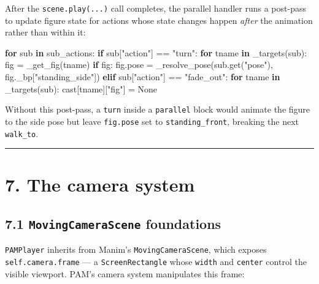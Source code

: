 \documentclass[
  11pt,
]{book}
\newenvironment{Shaded}{}{}
\newcommand{\ControlFlowTok}[1]{\textcolor[rgb]{0.00,0.44,0.13}{\textbf{#1}}}
\newcommand{\KeywordTok}[1]{\textcolor[rgb]{0.00,0.44,0.13}{\textbf{#1}}}
\newcommand{\NormalTok}[1]{#1}
\newcommand{\OperatorTok}[1]{\textcolor[rgb]{0.40,0.40,0.40}{#1}}
\newcommand{\StringTok}[1]{\textcolor[rgb]{0.25,0.44,0.63}{#1}}
\newcommand{\VariableTok}[1]{\textcolor[rgb]{0.10,0.09,0.49}{#1}}
\begin{document}
After the \texttt{scene.play(...)} call completes, the parallel handler
runs a post-pass to update figure state for actions whose state changes
happen \emph{after} the animation rather than within it:

\begin{Shaded}
\begin{Highlighting}[]
\ControlFlowTok{for}\NormalTok{ sub }\KeywordTok{in}\NormalTok{ sub\_actions:}
    \ControlFlowTok{if}\NormalTok{ sub[}\StringTok{"action"}\NormalTok{] }\OperatorTok{==} \StringTok{"turn"}\NormalTok{:}
        \ControlFlowTok{for}\NormalTok{ tname }\KeywordTok{in}\NormalTok{ \_targets(sub):}
\NormalTok{            fig }\OperatorTok{=}\NormalTok{ \_get\_fig(tname)}
            \ControlFlowTok{if}\NormalTok{ fig:}
\NormalTok{                fig.pose }\OperatorTok{=}\NormalTok{ \_resolve\_pose(sub.get(}\StringTok{"pose"}\NormalTok{),}
\NormalTok{                                         fig.\_bp[}\StringTok{"standing\_side"}\NormalTok{])}
    \ControlFlowTok{elif}\NormalTok{ sub[}\StringTok{"action"}\NormalTok{] }\OperatorTok{==} \StringTok{"fade\_out"}\NormalTok{:}
        \ControlFlowTok{for}\NormalTok{ tname }\KeywordTok{in}\NormalTok{ \_targets(sub):}
\NormalTok{            cast[tname][}\StringTok{"fig"}\NormalTok{] }\OperatorTok{=} \VariableTok{None}
\end{Highlighting}
\end{Shaded}

Without this post-pass, a \texttt{turn} inside a \texttt{parallel} block
would animate the figure to the side pose but leave \texttt{fig.pose}
set to \texttt{standing\_front}, breaking the next \texttt{walk\_to}.

\begin{center}\rule{0.5\linewidth}{0.5pt}\end{center}

\section{7. The camera system}\label{the-camera-system}

\subsection{\texorpdfstring{7.1 \texttt{MovingCameraScene}
foundations}{7.1 MovingCameraScene foundations}}\label{movingcamerascene-foundations}

\texttt{PAMPlayer} inherits from Manim's \texttt{MovingCameraScene},
which exposes \texttt{self.camera.frame} --- a \texttt{ScreenRectangle}
whose \texttt{width} and \texttt{center} control the visible viewport.
PAM's camera system manipulates this frame:
\end{document}
